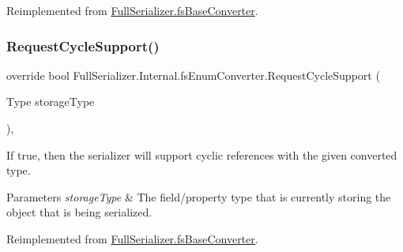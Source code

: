 Reimplemented from \hyperlink{class_full_serializer_1_1fs_base_converter_a415ea2ac9429bbb9927346af7cb7c2e1}{Full\+Serializer.\+fs\+Base\+Converter}.

\mbox{\label{class_full_serializer_1_1_internal_1_1fs_enum_converter_a9f297d3fbac4eecd05de362227a1161e}} 
\subsubsection{\texorpdfstring{Request\+Cycle\+Support()}{RequestCycleSupport()}}
{\footnotesize\ttfamily override bool Full\+Serializer.\+Internal.\+fs\+Enum\+Converter.\+Request\+Cycle\+Support (\begin{DoxyParamCaption}\item[{Type}]{storage\+Type }\end{DoxyParamCaption})\hspace{0.3cm}{\ttfamily [inline]}, {\ttfamily [virtual]}}



If true, then the serializer will support cyclic references with the given converted type. 


\begin{DoxyParams}{Parameters}
{\em storage\+Type} & The field/property type that is currently storing the object that is being serialized.\\
\hline
\end{DoxyParams}


Reimplemented from \hyperlink{class_full_serializer_1_1fs_base_converter_a4e850ab88cea1b89771c00e0b65febcd}{Full\+Serializer.\+fs\+Base\+Converter}.

\mbox{\label{class_full_serializer_1_1_internal_1_1fs_enum_converter_a4af727f1cb13c61c7e5f57bb6c3e682b}} 
